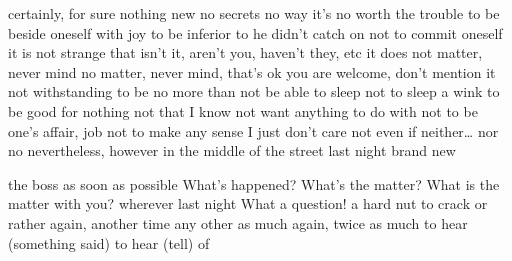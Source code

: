 {certainly, for sure}
{nothing new}
{no secrets}
{no way}
{it’s no worth the trouble}
{to be beside oneself with joy}
{to be inferior to}
{he didn’t catch on}
{not to commit oneself}
{it is not strange that}
{isn’t it, aren’t you, haven’t they, etc}
{it does not matter, never mind}
{no matter, never mind, that’s ok}
{you are welcome, don’t mention it}
{not withstanding}
{to be no more than}
{not be able to sleep}
{not to sleep a wink}
{to be good for nothing}
{not that I know}
{not want anything to do with}
{not to be one’s affair, job}
{not to make any sense}
{I just don’t care}
{not even if}
{neither… nor no}
{nevertheless, however}
{in the middle of the street}
{last night}
{brand new}

{the boss}
{as soon as possible}
{What’s happened?}
{What’s the matter?}
{What is the matter with you?}
{wherever}
{last night}
{What a question!}
{a hard nut to crack}
{or rather}
{again, another time}
{any other}
{as much again, twice as much}
{to hear (something said)}
{to hear (tell) of}

